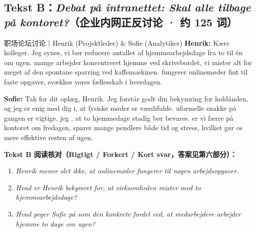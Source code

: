 \subsection*{Tekst B：\textit{Debat på intranettet: Skal alle tilbage på kontoret?}（企业内网正反讨论 · 约 125 词）}

\begin{emailbox}{职场论坛讨论｜Henrik (Projektleder) \& Sofie (Analytiker)}
\textbf{Henrik:} Kære kolleger. Jeg synes, vi bør reducere antallet af hjemmearbejdsdage fra to til én om ugen.  mange arbejder koncentreret hjemme ved skrivebordet,  vi mister alt for meget af den spontane sparring ved kaffemaskinen.  fungerer onlinemøder fint til faste opgaver,  svækkes vores fællesskab i hverdagen.

\textbf{Sofie:} Tak for dit oplæg, Henrik. Jeg forstår godt din bekymring for holdånden, og jeg er enig med dig i, at fysiske møder er værdifulde.  uformelle snakke på gangen er vigtige,  jeg , at to hjemmedage stadig bør bevares.  er vi færre på kontoret om fredagen,  sparer mange pendlere både tid og stress, hvilket gør os mere effektive resten af ugen.
\end{emailbox}

\textbf{Tekst B 阅读核对（Rigtigt / Forkert / Kort svar，答案见第六部分）：}
\begin{enumerate}
  \item \textit{Henrik mener slet ikke, at onlinemøder fungerer til nogen arbejdsopgaver.} \underline{\hspace{2.2cm}}
  \item \textit{Hvad er Henrik bekymret for, at virksomheden mister med to hjemmearbejdsdage?} \underline{\hspace{2.2cm}}
  \item \textit{Hvad peger Sofie på som den konkrete fordel ved, at medarbejdere arbejder hjemme to dage om ugen?} \underline{\hspace{2.2cm}}
\end{enumerate}

